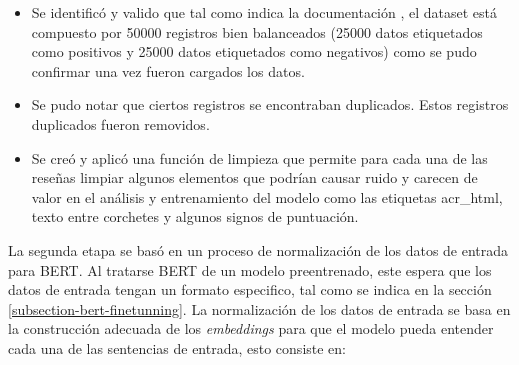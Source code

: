 \begin{itemize}
    \item Se identificó y valido que tal como indica la documentación \cite{maas-EtAl:2011:ACL-HLT2011}, el dataset está compuesto por 50000 registros bien balanceados (25000 datos etiquetados como positivos y 25000 datos etiquetados como negativos) como se pudo confirmar una vez fueron cargados los datos. 
    \item Se pudo notar que ciertos registros se encontraban duplicados. Estos registros duplicados fueron removidos.
    \item Se creó y aplicó una función de limpieza que permite para cada una de las reseñas limpiar algunos elementos que podrían causar ruido y carecen de valor en el análisis y entrenamiento del modelo como las etiquetas \acrshort{acr_html}, texto entre corchetes y algunos signos de puntuación.
\end{itemize}

La segunda etapa se basó en un proceso de normalización de los datos de entrada para BERT. Al tratarse BERT de un modelo preentrenado, este espera que los datos de entrada tengan un formato especifico, tal como se indica en la sección \ref{subsection-bert-finetunning}. La normalización de los datos de entrada se basa en la construcción adecuada de los \textit{embeddings} para que el modelo pueda entender cada una de las sentencias de entrada, esto consiste en:

